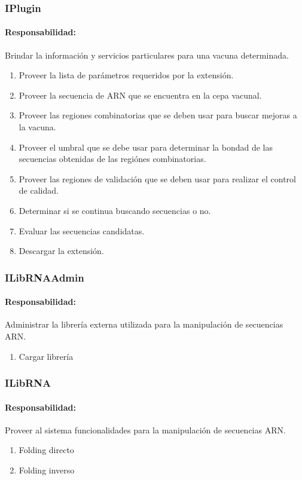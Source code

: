   \subsubsection{IPlugin}
    \paragraph{Responsabilidad:} Brindar la informaci\'on y servicios
particulares para una vacuna determinada.    
      \begin{enumerate}
       \item Proveer la lista de par\'ametros requeridos por la extensi\'on.
       \item Proveer la secuencia de ARN que se encuentra en la cepa vacunal.
       \item Proveer las regiones combinatorias que se deben usar para buscar
mejoras a la vacuna.
       \item Proveer el umbral que se debe usar para determinar la bondad de las
secuencias obtenidas de las regi\'ones combinatorias.
       \item Proveer las regiones de validaci\'on que se deben usar para
realizar el control de calidad.
       \item Determinar si se continua buscando secuencias o no.
       \item Evaluar las secuencias candidatas.
       \item Descargar la extensi\'on.
      \end{enumerate}         

  \subsubsection{ILibRNAAdmin}
    \paragraph{Responsabilidad:} Administrar la librer\'ia externa utilizada
para la manipulaci\'on de secuencias ARN.
      \begin{enumerate}
       \item Cargar librer\'ia
      \end{enumerate}  

  \subsubsection{ILibRNA}
    \paragraph{Responsabilidad:} Proveer al sistema funcionalidades para la
manipulaci\'on de secuencias ARN. 
      \begin{enumerate}
       \item Folding directo
       \item Folding inverso
      \end{enumerate}
